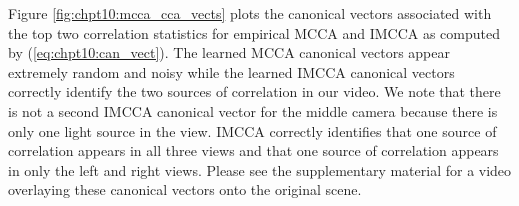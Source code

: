 Figure \ref{fig:chpt10:mcca_cca_vects} plots the canonical vectors associated with the top
two correlation statistics for empirical MCCA and IMCCA as computed by
(\ref{eq:chpt10:can_vect}). The learned MCCA canonical vectors appear extremely random
and noisy while the learned IMCCA canonical vectors correctly identify the two sources of
correlation in our video. We note that there is not a second IMCCA canonical vector for
the middle camera because there is only one light source in the view. IMCCA correctly
identifies that one source of correlation appears in all three views and that one source
of correlation appears in only the left and right views. Please see the supplementary
material for a video overlaying these canonical vectors onto the original scene.



